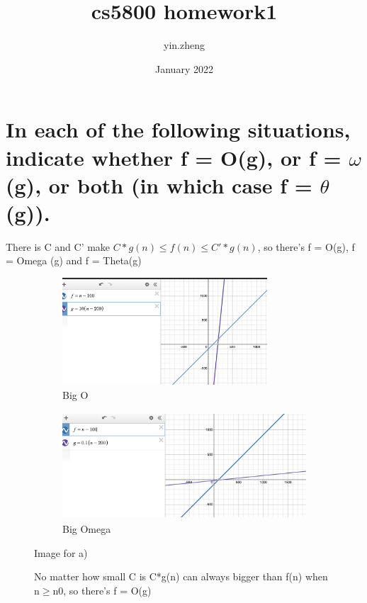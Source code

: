 \documentclass{article}
\title{cs5800 homework1}
\author{yin.zheng }
\date{January 2022}
\begin{document}
\maketitle
\section{
In each of the following situations, indicate whether f = O(g), or f = $\omega$(g), or both (in which case f = $\theta$(g)).}

\begin{enumerate}[label=(\alph*)]
\item 
There is C and C' make $C*g(n) \le f(n) \le C'*g(n)$, so  there's f = O(g), f = Omega (g) and f = Theta(g) \\%
    \begin{figure}[h]
    \begin{subfigure}{0.5\textwidth}
    \includegraphics[width=0.9\linewidth, height=4cm]{a)big O.png}     
    \caption{Big O}
    \end{subfigure}
    \begin{subfigure}{0.5\textwidth}
    \includegraphics[width=0.9\linewidth, height=4cm]{a) big omega.png}
    \caption{Big Omega}
    \label{fig:subim2}
    \end{subfigure}
    \caption{Image for a)}
    \label{fig:image2}
\end{figure}

\begin{figure}[h]
\item 
No matter how small C is C*g(n) can always bigger than f(n) when n$\ge$n0, so there's f = O(g)  %
    

\end{figure}
\end{enumerate}
\end{document}
